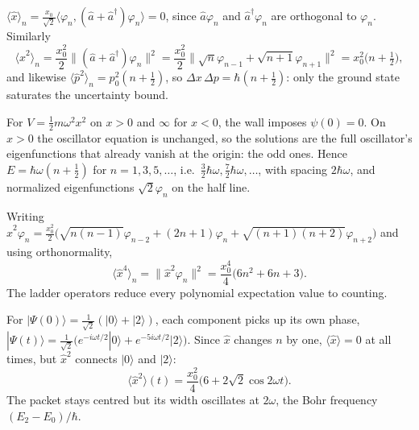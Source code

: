 \begin{example}
$\langle\hat{x}\rangle_n = \frac{x_0}{\sqrt2}\langle\varphi_n,(\hat{a}+\hat{a}^\dagger)\varphi_n\rangle = 0$, since $\hat{a}\varphi_n$ and $\hat{a}^\dagger\varphi_n$ are orthogonal to $\varphi_n$. Similarly
\[
    \langle\hat{x}^2\rangle_n = \frac{x_0^2}{2}\|(\hat{a}+\hat{a}^\dagger)\varphi_n\|^2 = \frac{x_0^2}{2}\bigl\|\sqrt{n}\varphi_{n-1} + \sqrt{n+1}\varphi_{n+1}\bigr\|^2 = x_0^2\bigl(n+\tfrac12\bigr),
\]
and likewise $\langle\hat{p}^2\rangle_n = p_0^2(n+\tfrac12)$, so $\Delta x\,\Delta p = \hbar(n+\tfrac12)$: only the ground state saturates the uncertainty bound.
\end{example}

\begin{example}
For $V = \frac12m\omega^2x^2$ on $x>0$ and $\infty$ for $x<0$, the wall imposes $\psi(0) = 0$. On $x>0$ the oscillator equation is unchanged, so the solutions are the full oscillator's eigenfunctions that already vanish at the origin: the odd ones. Hence $E = \hbar\omega(n+\frac12)$ for $n = 1,3,5,\ldots$, i.e.\ $\frac32\hbar\omega,\frac72\hbar\omega,\ldots$, with spacing $2\hbar\omega$, and normalized eigenfunctions $\sqrt2\varphi_n$ on the half line.
\end{example}

\begin{example}
Writing $\hat{x}^2\varphi_n = \frac{x_0^2}{2}\bigl(\sqrt{n(n-1)}\varphi_{n-2} + (2n+1)\varphi_n + \sqrt{(n+1)(n+2)}\varphi_{n+2}\bigr)$ and using orthonormality,
\[
    \langle\hat{x}^4\rangle_n = \|\hat{x}^2\varphi_n\|^2 = \frac{x_0^4}{4}\bigl(6n^2+6n+3\bigr).
\]
The ladder operators reduce every polynomial expectation value to counting.
\end{example}

\begin{example}
For $|\Psi(0)\rangle = \frac{1}{\sqrt2}(|0\rangle + |2\rangle)$, each component picks up its own phase, $|\Psi(t)\rangle = \frac{1}{\sqrt2}\bigl(e^{-i\omega t/2}|0\rangle + e^{-5i\omega t/2}|2\rangle\bigr)$. Since $\hat{x}$ changes $n$ by one, $\langle\hat{x}\rangle = 0$ at all times, but $\hat{x}^2$ connects $|0\rangle$ and $|2\rangle$:
\[
    \langle\hat{x}^2\rangle(t) = \frac{x_0^2}{4}\bigl(6 + 2\sqrt2\cos2\omega t\bigr).
\]
The packet stays centred but its width oscillates at $2\omega$, the Bohr frequency $(E_2-E_0)/\hbar$.
\end{example}

